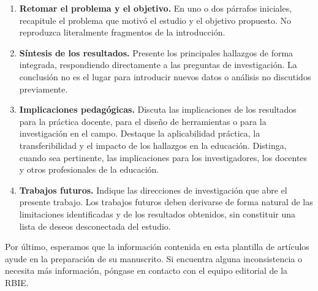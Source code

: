 \documentclass[spanish]{rbie2026}%
\begin{document}
\begin{enumerate}
  \item \textbf{Retomar el problema y el objetivo.} En uno o dos párrafos iniciales, recapitule el problema que motivó el estudio y el objetivo propuesto. No reproduzca literalmente fragmentos de la introducción.

  \item \textbf{Síntesis de los resultados.} Presente los principales hallazgos de forma integrada, respondiendo directamente a las preguntas de investigación. La conclusión no es el lugar para introducir nuevos datos o análisis no discutidos previamente.

  \item \textbf{Implicaciones pedagógicas.} Discuta las implicaciones de los resultados para la práctica docente, para el diseño de herramientas o para la investigación en el campo. Destaque la aplicabilidad práctica, la transferibilidad y el impacto de los hallazgos en la educación. Distinga, cuando sea pertinente, las implicaciones para los investigadores, los docentes y otros profesionales de la educación.

  \item \textbf{Trabajos futuros.} Indique las direcciones de investigación que abre el presente trabajo. Los trabajos futuros deben derivarse de forma natural de las limitaciones identificadas y de los resultados obtenidos, sin constituir una lista de deseos desconectada del estudio.
\end{enumerate}

Por último, esperamos que la información contenida en esta plantilla de artículos ayude en la preparación de su manuscrito. Si encuentra alguna inconsistencia o necesita más información, póngase en contacto con el equipo editorial de la RBIE.
\end{document}
